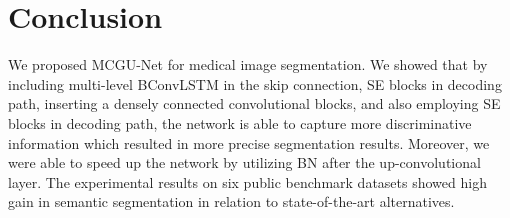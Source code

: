\documentclass[journal]{IEEEtran}
\begin{document}
\section{Conclusion}

We proposed MCGU-Net for medical image segmentation. We showed that by including multi-level BConvLSTM in the skip connection, SE blocks in decoding path, inserting a densely connected convolutional blocks, and also employing SE blocks in decoding path, the network is able to capture more discriminative information which resulted in more precise segmentation results. Moreover, we were able to speed up the network by utilizing BN after the up-convolutional layer. The experimental results on six public benchmark datasets showed high gain in semantic segmentation in relation to state-of-the-art alternatives. 
\end{document}
